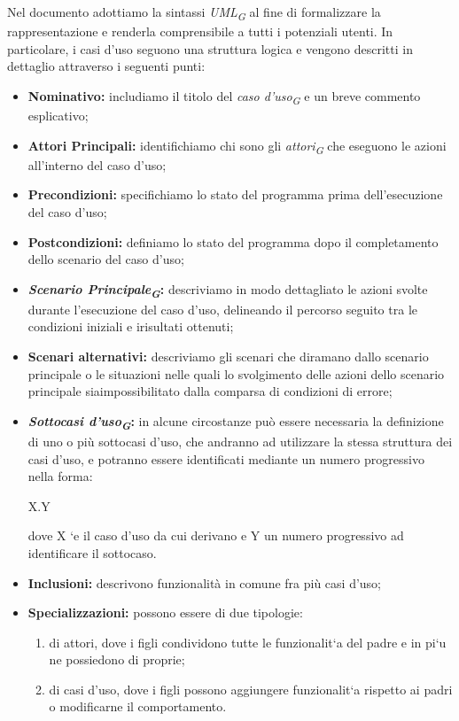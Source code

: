 Nel documento adottiamo la sintassi \textit{UML\textsubscript{G}} al fine di formalizzare la rappresentazione e
renderla comprensibile a tutti i potenziali utenti. In particolare, i casi d'uso seguono una
struttura logica e vengono descritti in dettaglio attraverso i seguenti punti:
\begin{itemize}
    \item \textbf{Nominativo:} includiamo il titolo del \textit{caso d'uso\textsubscript{G}} e un breve commento esplicativo;
    \item \textbf{Attori Principali:} identifichiamo chi sono gli \textit{attori\textsubscript{G}} che eseguono le azioni all’interno 
                del caso d'uso;
    \item \textbf{Precondizioni:} specifichiamo lo stato del programma prima dell'esecuzione del caso d'uso;
    \item \textbf{Postcondizioni:} definiamo lo stato del programma dopo il completamento dello scenario del caso d'uso;
    \item \textbf{\textit{Scenario Principale\textsubscript{G}}:} descriviamo in modo dettagliato le azioni svolte durante
                l'esecuzione del caso d'uso, delineando il percorso seguito tra le condizioni iniziali e irisultati ottenuti;
    \item \textbf{Scenari alternativi:} descriviamo gli scenari che diramano dallo scenario principale o le situazioni nelle quali lo svolgimento delle 
                azioni dello scenario principale siaimpossibilitato dalla comparsa di condizioni di errore;
    \item \textbf{\textit{Sottocasi d'uso\textsubscript{G}}:} in alcune circostanze può essere necessaria la definizione di uno
                o più sottocasi d'uso, che andranno ad utilizzare la stessa struttura dei casi d'uso, e potranno essere 
                identificati mediante un numero progressivo nella forma:
                \begin{center}
                    X.Y
                \end{center}
    dove X `e il caso d'uso da cui derivano e Y un numero progressivo ad identificare il sottocaso.
    \item \textbf{Inclusioni:} descrivono funzionalità in comune fra più casi d'uso;
    \item \textbf{Specializzazioni:} possono essere di due tipologie:
    \begin{enumerate}
        \item di attori, dove i figli condividono tutte le funzionalit`a del padre e in pi`u ne
            possiedono di proprie;
        \item di casi d'uso, dove i figli possono aggiungere funzionalit`a rispetto ai padri o
            modificarne il comportamento.
    \end{enumerate}
\end{itemize}

